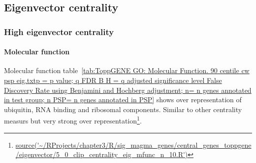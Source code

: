\clearpage


\subsection{Eigenvector centrality}
\subsubsection{High eigenvector centrality}

\paragraph{Molecular function}

Molecular function table~\ref{tab:ToppGENE GO: Molecular Function. 90 centile cw psp eig.txtp = p value; q FDR B H = q adjusted significance level False Discovery Rate using Benjamini and Hochberg adjustment; n= n genes annotated in test group; n PSP= n genes annotated in PSP} shows over representation of ubiquitin, RNA binding and ribosomal components. Similar to other centrality measurs but very strong over representation\footnote{\url{source('~/RProjects/chapter3/R/sig_magma_genes/central_genes_toppgene/eigenvector/5_0_clip_centrality_eig_mfunc_n_10.R')}}.


